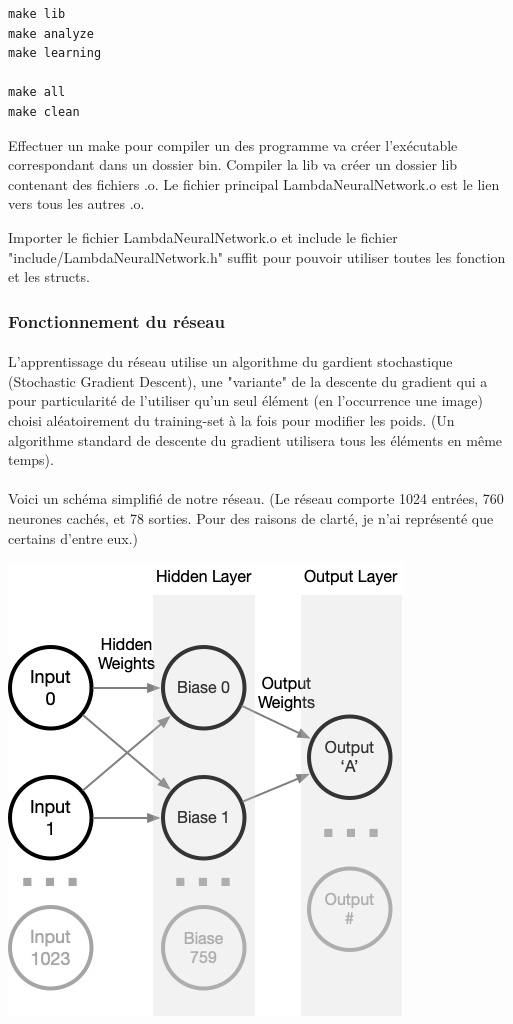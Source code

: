 \documentclass{article}
\begin{document}
\begin{lstlisting}
make lib
make analyze
make learning

make all
make clean
\end{lstlisting}

Effectuer un make pour compiler un des programme va créer l'exécutable correspondant dans un dossier bin.
Compiler la lib va créer un dossier lib contenant des fichiers .o. Le fichier principal LambdaNeuralNetwork.o est le lien vers tous les autres .o.

Importer le fichier LambdaNeuralNetwork.o et include le fichier "include/LambdaNeuralNetwork.h" suffit pour pouvoir utiliser toutes les fonction et les structs.


\subsubsection{Fonctionnement du réseau}

\paragraph{}L'apprentissage du réseau utilise un algorithme du gardient stochastique (Stochastic Gradient Descent), une "variante" de la descente du gradient qui a pour particularité de l'utiliser qu'un seul élément (en l'occurrence une image) choisi aléatoirement du training-set à la fois pour modifier les poids. (Un algorithme standard de descente du gradient utilisera tous les éléments en même temps).

\paragraph{}Voici un schéma simplifié de notre réseau.
(Le réseau comporte 1024 entrées, 760 neurones cachés, et 78 sorties. Pour des raisons de clarté, je n'ai représenté que certains d'entre eux.)

\begin{center}
	\includegraphics[scale=0.5]{Neuron}
\end{center}
\end{document}
